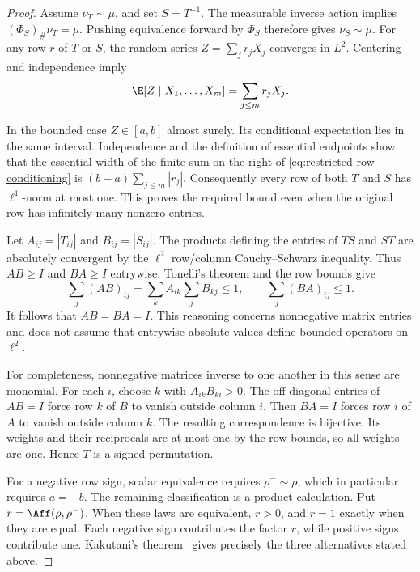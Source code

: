 \begin{proof}
Assume \(\nu_T\sim\mu\), and set \(S=T^{-1}\).
The measurable inverse action implies
\((\Phi_S)_\#\nu_T=\mu\).
Pushing equivalence forward by \(\Phi_S\) therefore gives
\(\nu_S\sim\mu\).
For any row \(r\) of \(T\) or \(S\), the random series
\(Z=\sum_jr_jX_j\) converges in \(L^2\).
Centering and independence imply
\begin{equation}
 \E[Z\mid X_1,\ldots,X_m]=\sum_{j\leq m}r_jX_j.
 \label{eq:restricted-row-conditioning}
\end{equation}

In the bounded case \(Z\in[a,b]\) almost surely.
Its conditional expectation lies in the same interval.
Independence and the definition of essential endpoints show that
the essential width of the finite sum on the right of
\eqref{eq:restricted-row-conditioning} is
\((b-a)\sum_{j\leq m}|r_j|\).
Consequently every row of both \(T\) and \(S\) has
\(\ell^1\)-norm at most one.
This proves the required bound even when the original row has
infinitely many nonzero entries.

Let \(A_{ij}=|T_{ij}|\) and \(B_{ij}=|S_{ij}|\).
The products defining the entries of \(TS\) and \(ST\) are absolutely
convergent by the \(\ell^2\) row/column Cauchy--Schwarz inequality.
Thus \(AB\geq I\) and \(BA\geq I\) entrywise.
Tonelli's theorem and the row bounds give
\[
 \sum_j(AB)_{ij}
 =\sum_k A_{ik}\sum_jB_{kj}\leq1,
 \qquad
 \sum_j(BA)_{ij}\leq1.
\]
It follows that \(AB=BA=I\).
This reasoning concerns nonnegative matrix entries and does not
assume that entrywise absolute values define bounded operators
on \(\ell^2\).

For completeness, nonnegative matrices inverse to one another in
this sense are monomial.
For each \(i\), choose \(k\) with \(A_{ik}B_{ki}>0\).
The off-diagonal entries of \(AB=I\) force row \(k\) of \(B\)
to vanish outside column \(i\).
Then \(BA=I\) forces row \(i\) of \(A\) to vanish outside column \(k\).
The resulting correspondence is bijective.
Its weights and their reciprocals are at most one by the row bounds,
so all weights are one.
Hence \(T\) is a signed permutation.

For a negative row sign, scalar equivalence requires
\(\rho^-\sim\rho\), which in particular requires \(a=-b\).
The remaining classification is a product calculation.
Put \(r=\Aff(\rho,\rho^-)\).
When these laws are equivalent, \(r>0\), and \(r=1\) exactly when
they are equal.
Each negative sign contributes the factor \(r\), while positive
signs contribute one.
Kakutani's theorem~\cite{kakutani1948equivalence} gives precisely
the three alternatives stated above.


\end{proof}
